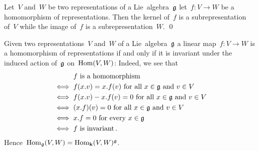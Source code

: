 \begin{lemma}
  Let~$V$ and~$W$ be two representations of a Lie~algebra~$\mathfrak{g}$ let~$f \colon V \to W$ be a homomorphism of representations.
  Then the kernel of~$f$ is a subrepresentation of~$V$ while the image of~$f$ is a subrepresentation~$W$.
  \qed
\end{lemma}


\begin{remark}
  \label{homomorphisms of representations as invariants}
  Given two representations~$V$ and~$W$ of a Lie~algebra~$\mathfrak{g}$ a linear map~$f \colon V \to W$ is a homomorphism of representations if and only if it is invariant under the induced action of~$\mathfrak{g}$ on~$\operatorname{Hom}(V,W)$:
  Indeed, we see that
  \begin{align*}
        {}& \text{$f$ is a homomorphism}  \\
    \iff{}& \text{$f(x.v) = x.f(v)$ for all~$x \in \mathfrak{g}$ and~$v \in V$}  \\
    \iff{}& \text{$f(x.v) - x.f(v) = 0$ for all~$x \in \mathfrak{g}$ and~$v \in V$}  \\
    \iff{}& \text{$(x.f)(v) = 0$ for all~$x \in \mathfrak{g}$ and~$v \in V$} \\
    \iff{}& \text{$x.f = 0$ for every~$x \in \mathfrak{g}$}  \\
    \iff{}& \text{$f$ is invariant} \,.
  \end{align*}
  Hence~$\operatorname{Hom}_{\mathfrak{g}}(V,W) = \operatorname{Hom}_{\mathbf{k}}(V,W)^{\mathfrak{g}}$.
\end{remark}


